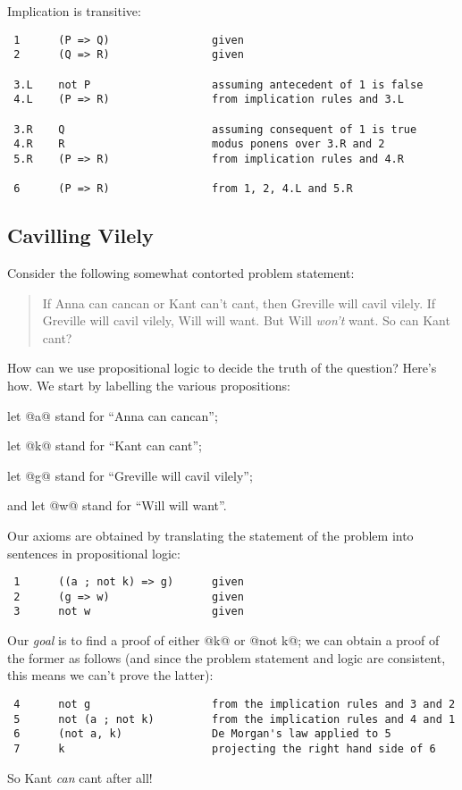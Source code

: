 Implication is transitive:
\begin{verbatim}
 1      (P => Q)                given
 2      (Q => R)                given

 3.L    not P                   assuming antecedent of 1 is false
 4.L    (P => R)                from implication rules and 3.L

 3.R    Q                       assuming consequent of 1 is true
 4.R    R                       modus ponens over 3.R and 2
 5.R    (P => R)                from implication rules and 4.R

 6      (P => R)                from 1, 2, 4.L and 5.R
\end{verbatim}

\subsection{Cavilling Vilely}


Consider the following somewhat contorted problem statement:
\begin{quote}
If Anna can cancan or Kant can't cant, then Greville will cavil vilely.
If Greville will cavil vilely, Will will want.
But Will \emph{won't} want.
So can Kant cant?
\end{quote}
How can we use propositional logic to decide the truth of the question?
Here's how.  We start by labelling the various propositions:
\begin{description}
\item let @a@ stand for ``Anna can cancan'';
\item let @k@ stand for ``Kant can cant'';
\item let @g@ stand for ``Greville will cavil vilely'';
\item and let @w@ stand for ``Will will want''.
\end{description}

Our axioms are obtained by translating the statement of the problem into
sentences in propositional logic:
\begin{verbatim}
 1      ((a ; not k) => g)      given
 2      (g => w)                given
 3      not w                   given
\end{verbatim}
Our \emph{goal} is to find a proof of either @k@ or @not k@; we can
obtain a proof of the former as follows (and since the problem statement
and logic are consistent, this means we can't prove the latter):
\begin{verbatim}
 4      not g                   from the implication rules and 3 and 2
 5      not (a ; not k)         from the implication rules and 4 and 1
 6      (not a, k)              De Morgan's law applied to 5
 7      k                       projecting the right hand side of 6
\end{verbatim}
So Kant \emph{can} cant after all!

